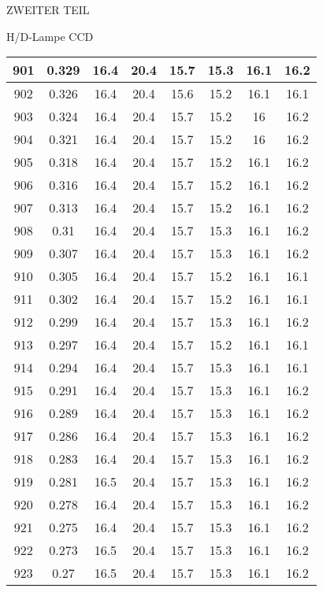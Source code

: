 \begin{appendix}
\begin{chapter}{ZWEITER TEIL}
\begin{section}{H/D-Lampe CCD}
\begin{scriptsize}
\begin{longtable}[htbp]{|c|c|c|c|c|c|c|c|}
            901 & 0.329 & 16.4 & 20.4 & 15.7 & 15.3 & 16.1 & 16.2 \\ \hline
            902 & 0.326 & 16.4 & 20.4 & 15.6 & 15.2 & 16.1 & 16.1 \\ \hline
            903 & 0.324 & 16.4 & 20.4 & 15.7 & 15.2 & 16 & 16.2 \\ \hline
            904 & 0.321 & 16.4 & 20.4 & 15.7 & 15.2 & 16 & 16.2 \\ \hline
            905 & 0.318 & 16.4 & 20.4 & 15.7 & 15.2 & 16.1 & 16.2 \\ \hline
            906 & 0.316 & 16.4 & 20.4 & 15.7 & 15.2 & 16.1 & 16.2 \\ \hline
            907 & 0.313 & 16.4 & 20.4 & 15.7 & 15.2 & 16.1 & 16.2 \\ \hline
            908 & 0.31 & 16.4 & 20.4 & 15.7 & 15.3 & 16.1 & 16.2 \\ \hline
            909 & 0.307 & 16.4 & 20.4 & 15.7 & 15.3 & 16.1 & 16.2 \\ \hline
            910 & 0.305 & 16.4 & 20.4 & 15.7 & 15.2 & 16.1 & 16.1 \\ \hline
            911 & 0.302 & 16.4 & 20.4 & 15.7 & 15.2 & 16.1 & 16.1 \\ \hline
            912 & 0.299 & 16.4 & 20.4 & 15.7 & 15.3 & 16.1 & 16.2 \\ \hline
            913 & 0.297 & 16.4 & 20.4 & 15.7 & 15.2 & 16.1 & 16.1 \\ \hline
            914 & 0.294 & 16.4 & 20.4 & 15.7 & 15.3 & 16.1 & 16.1 \\ \hline
            915 & 0.291 & 16.4 & 20.4 & 15.7 & 15.3 & 16.1 & 16.2 \\ \hline
            916 & 0.289 & 16.4 & 20.4 & 15.7 & 15.3 & 16.1 & 16.2 \\ \hline
            917 & 0.286 & 16.4 & 20.4 & 15.7 & 15.3 & 16.1 & 16.2 \\ \hline
            918 & 0.283 & 16.4 & 20.4 & 15.7 & 15.3 & 16.1 & 16.2 \\ \hline
            919 & 0.281 & 16.5 & 20.4 & 15.7 & 15.3 & 16.1 & 16.2 \\ \hline
            920 & 0.278 & 16.4 & 20.4 & 15.7 & 15.3 & 16.1 & 16.2 \\ \hline
            921 & 0.275 & 16.4 & 20.4 & 15.7 & 15.3 & 16.1 & 16.2 \\ \hline
            922 & 0.273 & 16.5 & 20.4 & 15.7 & 15.3 & 16.1 & 16.2 \\ \hline
            923 & 0.27 & 16.5 & 20.4 & 15.7 & 15.3 & 16.1 & 16.2 \\ \hline

\end{longtable}
\end{scriptsize}
\end{section}
\end{chapter}
\end{appendix}
